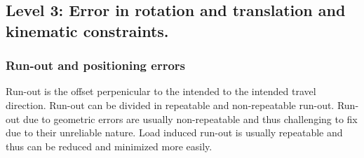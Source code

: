\documentclass[11pt, a4paper]{article}
\numberwithin{equation}{section}
\numberwithin{figure}{section}
\begin{document}
\subsection{Level 3: Error in rotation and translation and kinematic constraints.}

\subsubsection{Run-out and positioning errors}
Run-out is the offset perpenicular to the intended to the intended travel direction. Run-out can be divided in repeatable and non-repeatable run-out. Run-out due to geometric errors are usually non-repeatable and thus challenging to fix due to their unreliable nature. Load induced run-out is usually repeatable and thus can be reduced and minimized more easily.\\
\end{document}
